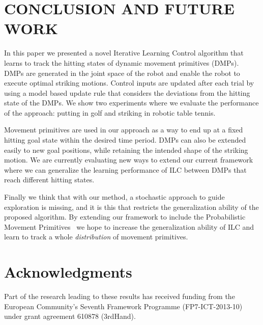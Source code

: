 \section{CONCLUSION AND FUTURE WORK}\label{conclusion}

In this paper we presented a novel Iterative Learning Control algorithm that learns to track the hitting states of dynamic movement primitives (DMPs). %
DMPs are generated in the joint space of the robot and enable the robot to execute optimal striking motions. Control inputs are updated after each trial by using a model based update rule that considers the deviations from the hitting state of the DMPs. We show two experiments where we evaluate the performance of the approach: putting in golf and striking in robotic table tennis. 

Movement primitives are used in our approach as a way to end up at a fixed hitting goal state within the desired time period. DMPs can also be extended easily to new goal positions, while retaining the intended shape of the striking motion. We are currently evaluating new ways to extend our current framework where we can generalize the learning performance of ILC between DMPs that reach different hitting states.

Finally we think that with our method, a stochastic approach to guide exploration is missing, and it is this that restricts the generalization ability of the proposed algorithm. By extending our framework to include the Probabilistic Movement Primitives~\cite{Paraschos13} we hope to increase the generalization ability of ILC and learn to track a whole \emph{distribution} of movement primitives.

%
%

\section{Acknowledgments}

Part of the research leading to these results has received funding from the European Community's Seventh Framework Programme (FP7-ICT-2013-10) under grant agreement 610878 (3rdHand).
